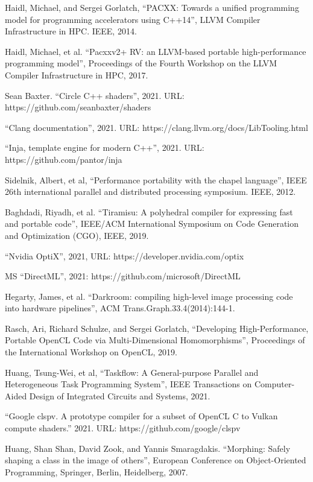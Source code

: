 \documentclass[11pt,fleqn,english,russian]{report} %
\begin{document}
\begin{thebibliography}{10}
	 Haidl, Michael, and Sergei Gorlatch, ``PACXX: Towards a unified programming model for programming accelerators using C++14'', LLVM Compiler Infrastructure in HPC. IEEE, 2014.
	
	 Haidl, Michael, et al. ``Pacxxv2+ RV: an LLVM-based portable high-performance programming model'', Proceedings of the Fourth Workshop on the LLVM Compiler Infrastructure in HPC, 2017. 
	
	 Sean Baxter. ``Circle C++ shaders'', 2021. URL: https://github.com/seanbaxter/shaders  
	
	 ``Clang documentation'', 2021. URL: https://clang.llvm.org/docs/LibTooling.html
	
	 ``Inja, template engine for modern C++'', 2021. URL: https://github.com/pantor/inja
	
	 Sidelnik, Albert, et al, ``Performance portability with the chapel language'', IEEE 26th international parallel and distributed processing symposium. IEEE, 2012. 
	
	 Baghdadi, Riyadh, et al. ``Tiramisu: A polyhedral compiler for expressing fast and portable code'', IEEE/ACM International Symposium on Code Generation and Optimization (CGO), IEEE, 2019. 
	
	 ``Nvidia OptiX'', 2021, URL: https://developer.nvidia.com/optix 
	
	 MS ``DirectML'', 2021: https://github.com/microsoft/DirectML 
	
	 Hegarty, James, et al. ``Darkroom: compiling high-level image processing code into hardware pipelines'', ACM Trans.Graph.33.4(2014):144-1. 
	
	 Rasch, Ari, Richard Schulze, and Sergei Gorlatch, ``Developing High-Performance, Portable OpenCL Code via Multi-Dimensional Homomorphisms'', Proceedings of the International Workshop on OpenCL, 2019. 
	
	 Huang, Tsung-Wei, et al, ``Taskflow: A General-purpose Parallel and Heterogeneous Task Programming System'', IEEE Transactions on Computer-Aided Design of Integrated Circuits and Systems, 2021. 
	
	 ``Google clspv. A prototype compiler for a subset of OpenCL C to Vulkan compute shaders.'' 2021. URL: https://github.com/google/clspv
	
	 Huang, Shan Shan, David Zook, and Yannis Smaragdakis. ``Morphing: Safely shaping a class in the image of others'', European Conference on Object-Oriented Programming, Springer, Berlin, Heidelberg, 2007. 
	

\end{thebibliography}
\end{document}
